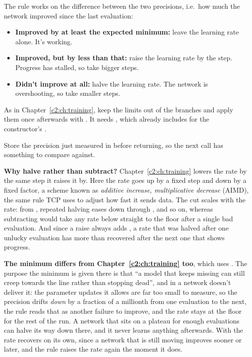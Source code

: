 The rule works on the difference between the two precisions, i.e.\ how much the network improved
since the last evaluation:
\begin{itemize}
  \item \textbf{Improved by at least the expected minimum:} leave the learning rate alone. It's
    working.
  \item \textbf{Improved, but by less than that:} raise the learning rate by the step. Progress has
    stalled, so take bigger steps.
  \item \textbf{Didn't improve at all:} halve the learning rate. The network is overshooting, so
    take smaller steps.
\end{itemize}
As in Chapter~\ref{c2:ch:training}, keep the limits out of the branches and apply them once
afterwards with .
It needs , which  already includes for the constructor's
.

Store the precision just measured in  before returning, so the next call has
something to compare against.

\textbf{Why halve rather than subtract?} Chapter~\ref{c2:ch:training} lowers the rate by the same
step it raises it by. Here the rate goes up by a fixed step and down by a fixed factor, a scheme
known as \emph{additive increase, multiplicative decrease} (AIMD), the same rule TCP uses to adjust
how fast it sends data. The cut scales with the rate: from , repeated halving eases down
through ,  and so on, whereas subtracting  would take any rate
below  straight to the floor after a single bad evaluation. And since a raise always adds
, a rate that was halved after one unlucky evaluation has more than recovered after the
next one that shows progress.

\textbf{The minimum differs from Chapter~\ref{c2:ch:training} too}, which uses . The
purpose the minimum is given there is that ``a model that keeps missing can still creep towards the
line rather than stopping dead'', and in a network  doesn't deliver it: the parameter
updates it allows are far too small to measure, so the precision drifts \emph{down} by a fraction
of a millionth from one evaluation to the next, the rule reads that as another failure to improve,
and the rate stays at the floor for the rest of the run. A network that sits on a plateau for
enough evaluations can halve its way down there, and it never learns anything afterwards. With
 the rate recovers on its own, since a network that is still moving improves sooner or
later, and the rule raises the rate again the moment it does.


